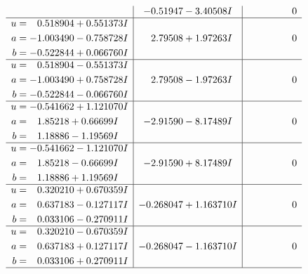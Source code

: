 \documentclass[1p]{elsarticle_modified}
\theoremstyle{definition}
\begin{document}
$$\begin{array}{c|c|c}
 & -0.51947 - 3.40508 I & \phantom{-0.000000 } 0 \\ \hline\begin{aligned}
u &= \phantom{-}0.518904 + 0.551373 I \\
a &= -1.003490 - 0.758728 I \\
b &= -0.522844 + 0.066760 I\end{aligned}
 & \phantom{-}2.79508 + 1.97263 I & \phantom{-0.000000 } 0 \\ \hline\begin{aligned}
u &= \phantom{-}0.518904 - 0.551373 I \\
a &= -1.003490 + 0.758728 I \\
b &= -0.522844 - 0.066760 I\end{aligned}
 & \phantom{-}2.79508 - 1.97263 I & \phantom{-0.000000 } 0 \\ \hline\begin{aligned}
u &= -0.541662 + 1.121070 I \\
a &= \phantom{-}1.85218 + 0.66699 I \\
b &= \phantom{-}1.18886 - 1.19569 I\end{aligned}
 & -2.91590 - 8.17489 I & \phantom{-0.000000 } 0 \\ \hline\begin{aligned}
u &= -0.541662 - 1.121070 I \\
a &= \phantom{-}1.85218 - 0.66699 I \\
b &= \phantom{-}1.18886 + 1.19569 I\end{aligned}
 & -2.91590 + 8.17489 I & \phantom{-0.000000 } 0 \\ \hline\begin{aligned}
u &= \phantom{-}0.320210 + 0.670359 I \\
a &= \phantom{-}0.637183 - 0.127117 I \\
b &= \phantom{-}0.033106 - 0.270911 I\end{aligned}
 & -0.268047 + 1.163710 I & \phantom{-0.000000 } 0 \\ \hline\begin{aligned}
u &= \phantom{-}0.320210 - 0.670359 I \\
a &= \phantom{-}0.637183 + 0.127117 I \\
b &= \phantom{-}0.033106 + 0.270911 I\end{aligned}
 & -0.268047 - 1.163710 I & \phantom{-0.000000 } 0\\
 \hline 
 \end{array}$$\newpage$$\begin{array}{c|c|c}  

\end{array}$$
\end{document}
